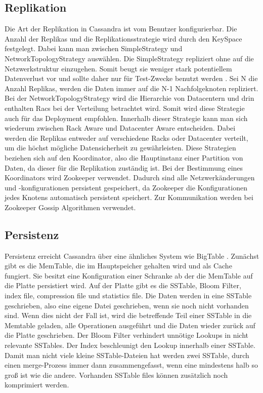 \subsection{Replikation}
Die Art der Replikation in Cassandra ist vom Benutzer konfigurierbar. Die Anzahl der Replikas und die Replikationsstrategie wird durch den KeySpace festgelegt. Dabei kann man zwischen SimpleStrategy und NetworkTopologyStrategy auswählen. Die SimpleStrategy repliziert ohne auf die Netzwerkstruktur einzugehen. Somit beugt sie weniger stark potentiellem Datenverlust vor und sollte daher nur für Test-Zwecke benutzt werden . Sei N die Anzahl Replikas, werden die Daten immer auf die N-1 Nachfolgeknoten repliziert. Bei der NetworkTopologyStrategy wird die Hierarchie von Datacentern und drin enthalten Racs bei der Verteilung betrachtet wird. Somit wird diese Strategie auch für das Deployment empfohlen. Innerhalb dieser Strategie kann man sich wiederum zwischen Rack Aware und Datacenter Aware entscheiden. Dabei werden die Replikas entweder auf verschiedene Racks oder Datacenter verteilt, um die höchst mögliche Datensicherheit zu gewährleisten. Diese Strategien beziehen sich auf den Koordinator, also die Hauptinstanz einer Partition von Daten, da dieser für die Replikation zuständig ist.
Bei der Bestimmung eines Koordinators wird Zookeeper verwendet. Dadurch sind alle Netzwerkänderungen und -konfigurationen persistent gespeichert, da Zookeeper die Konfigurationen jedes Knotens automatisch persistent speichert. Zur Kommunikation werden bei Zookeeper Gossip Algorithmen verwendet.

\subsection{Persistenz}
Persistenz erreicht Cassandra über eine ähnliches System wie BigTable \cite{bigtable}. Zunächst gibt es die MemTable, die im Hauptspeicher gehalten wird und als Cache fungiert. Sie besitzt eine Konfiguration einer Schranke ab der die MemTable auf die Platte persistiert wird. Auf der Platte gibt es die SSTable, Bloom Filter, index file, compression file und statistics file. Die Daten werden in eine SSTable geschrieben, also eine eigene Datei geschrieben, wenn sie noch nicht vorhanden sind. Wenn dies nicht der Fall ist, wird die betreffende Teil einer SSTable in die Memtable geladen, alle Operationen ausgeführt und die Daten wieder zurück auf die Platte geschrieben. Der Bloom Filter verhindert unnötige Lookups in nicht relevante SSTables. Der Index beschleunigt den Lookup innerhalb einer SSTable. Damit man nicht viele kleine SSTable-Dateien hat werden zwei SSTable, durch einen merge-Prozess immer dann zusammengefasst, wenn eine mindestens halb so groß ist wie die andere. Vorhanden SSTable files können zusätzlich noch komprimiert werden.

